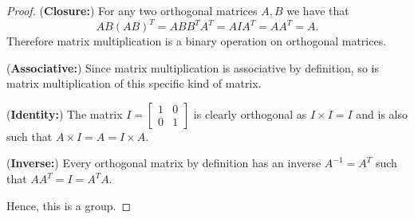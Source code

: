 \documentclass{article}
\begin{document}
\begin{proof}

    (\textbf{Closure:})
    For any two orthogonal matrices $A,B$ we have that
    \begin{equation*}
        AB(AB)^T = ABB^TA^T = AIA^T = AA^T = A.
    \end{equation*}
    Therefore matrix multiplication is a binary operation on orthogonal matrices.

    (\textbf{Associative:}) Since matrix multiplication is associative by definition, so is
    matrix multiplication of this specific kind of matrix.

    (\textbf{Identity:}) The matrix $I = \begin{bmatrix}
            1 & 0 \\
            0 & 1
        \end{bmatrix}$ is clearly orthogonal as $I \times I = I$
    and is also such that $A\times I = A = I \times A$.

    (\textbf{Inverse:}) Every orthogonal matrix by definition has an inverse
    $A^{-1} = A^T$ such that $AA^T = I = A^T A$.

    Hence, this is a group.
\end{proof}
\end{document}
